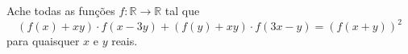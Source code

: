 Ache todas as funções $f:\mathbb{R} \to \mathbb{R}$ tal que
$$(f(x)+xy)\cdot f(x-3y)+(f(y)+xy)\cdot f(3x-y)=(f(x+y))^2$$
para quaisquer $x$ e $y$ reais.
